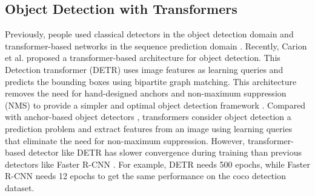 \documentclass[sn-mathphys]{sn-jnl}\jyear{2021}\theoremstyle{thmstyleone}\newtheorem{theorem}{Theorem}\newtheorem{proposition}[theorem]{Proposition}\theoremstyle{thmstyletwo}\newtheorem{example}{Example}\newtheorem{remark}{Remark}\theoremstyle{thmstylethree}\newtheorem{definition}{Definition}\usepackage{amsmath}
\begin{document}
\subsection{Object Detection with Transformers}
Previously, people used classical detectors \cite{ssd23, retinaNet68, yolox34, faster23, fast15, mask86, shehzadi1} in the object detection domain and transformer-based networks in the sequence prediction domain \cite{nlp12}. Recently, Carion et al. \cite{att75} proposed a transformer-based architecture for object detection. This Detection transformer (DETR) \cite {detr34} uses image features as learning queries and predicts the bounding boxes using bipartite graph matching. This architecture removes the need for hand-designed anchors \cite{anchors45} and non-maximum suppression (NMS) to provide a simpler and optimal object detection framework \cite{shehzadi2}. Compared with anchor-based object detectors \cite{rcnn13, fast15, faster23, mask86, sppNet57, ssd23, yolox34, retinaNet68}, transformers consider object detection a prediction problem and extract features from an image using learning queries that eliminate the need for non-maximum suppression. However, transformer-based detector like DETR has slower convergence during training than previous detectors like Faster R-CNN \cite{faster23}. For example, DETR  needs 500 epochs, while Faster R-CNN needs 12 epochs to get the same performance on the coco detection dataset.\\
\end{document}
